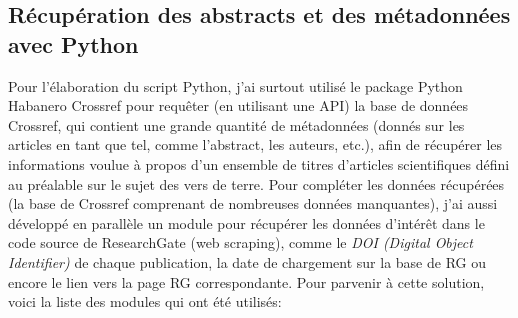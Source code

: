 \documentclass{book}
\begin{document}
\subsection{Récupération des abstracts et des métadonnées avec Python}
\noindent
Pour l'élaboration du script Python, j'ai surtout utilisé le package Python Habanero Crossref pour requêter (en utilisant une API) la base de données Crossref, qui contient une grande
quantité de métadonnées (donnés sur les articles en tant que tel, comme
l'abstract, les auteurs, etc.), afin de récupérer les informations voulue à
propos d'un ensemble de titres d'articles scientifiques défini au préalable sur
le sujet des vers de terre. Pour compléter les données récupérées (la base de
Crossref comprenant de nombreuses données manquantes), j'ai aussi développé en
parallèle un module pour récupérer les données d'intérêt dans le code source de
ResearchGate (web scraping), comme le \textit{DOI (Digital Object Identifier)}
de chaque publication, la date de chargement sur la base de RG ou encore le
lien vers la page RG correspondante. Pour parvenir à cette solution, voici la liste des modules qui ont été utilisés:
\end{document}
